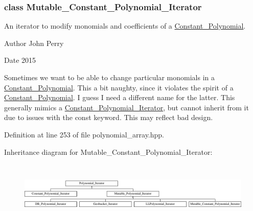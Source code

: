 \label{class_mutable___constant___polynomial___iterator}
\subsubsection{class Mutable\+\_\+\+Constant\+\_\+\+Polynomial\+\_\+\+Iterator}
An iterator to modify monomials and coefficients of a \hyperlink{group__polygroup_class_constant___polynomial}{Constant\+\_\+\+Polynomial}. 

\begin{DoxyAuthor}{Author}
John Perry 
\end{DoxyAuthor}
\begin{DoxyDate}{Date}
2015
\end{DoxyDate}
Sometimes we want to be able to change particular monomials in a \hyperlink{group__polygroup_class_constant___polynomial}{Constant\+\_\+\+Polynomial}. This a bit naughty, since it violates the spirit of a \hyperlink{group__polygroup_class_constant___polynomial}{Constant\+\_\+\+Polynomial}. I guess I need a different name for the latter. This generally mimics a \hyperlink{group___iterator_group_class_constant___polynomial___iterator}{Constant\+\_\+\+Polynomial\+\_\+\+Iterator}, but cannot inherit from it due to issues with the {\ttfamily const} keyword. This may reflect bad design. 

Definition at line 253 of file polynomial\+\_\+array.\+hpp.

Inheritance diagram for Mutable\+\_\+\+Constant\+\_\+\+Polynomial\+\_\+\+Iterator\+:\begin{figure}[H]
\begin{center}
\leavevmode
\includegraphics[height=3.000000cm]{group___iterator_group}
\end{center}
\end{figure}

